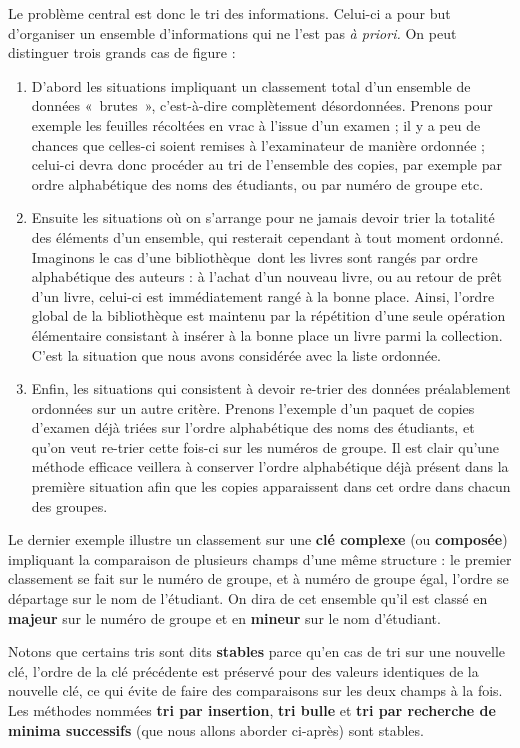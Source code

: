 {
Le problème central est donc le tri des informations. Celui-ci a pour
but d’organiser un ensemble d’informations qui ne l’est pas \textit{à
priori. }On peut distinguer trois grands cas de figure :}

\liststyleWWviiiNumi
\begin{enumerate}
\item {
D’abord les situations impliquant un classement total d’un ensemble de
données «~brutes~», c’est-à-dire complètement désordonnées. Prenons
pour exemple les feuilles récoltées en vrac à l’issue d’un examen ; il
y a peu de chances que celles-ci soient remises à l’examinateur de
manière ordonnée ; celui-ci devra donc procéder au tri de l’ensemble
des copies, par exemple par ordre alphabétique des noms des étudiants,
ou par numéro de groupe etc.}
\item {
Ensuite les situations où on s’arrange pour ne jamais devoir trier la
totalité des éléments d’un ensemble, qui resterait cependant à tout
moment ordonné. Imaginons le cas d’une bibliothèque~dont les livres
sont rangés par ordre alphabétique des auteurs : à l’achat d’un nouveau
livre, ou au retour de prêt d’un livre, celui-ci est immédiatement
rangé à la bonne place. Ainsi, l’ordre global de la bibliothèque est
maintenu par la répétition d’une seule opération élémentaire consistant
à insérer à la bonne place un livre parmi la collection. C’est la
situation que nous avons considérée avec la liste ordonnée.}
\item {
Enfin, les situations qui consistent à devoir re-trier des données
préalablement ordonnées sur un autre critère. Prenons l’exemple d’un
paquet de copies d’examen déjà triées sur l’ordre alphabétique des noms
des étudiants, et qu’on veut re-trier cette fois-ci sur les numéros de
groupe. Il est clair qu’une méthode efficace veillera à conserver
l’ordre alphabétique déjà présent dans la première situation afin que
les copies apparaissent dans cet ordre dans chacun des groupes.}
\end{enumerate}
{
Le dernier exemple illustre un classement sur une \textbf{clé complexe}
(ou \textbf{composée}) impliquant la comparaison de plusieurs champs
d’une même structure : le premier classement se fait sur le numéro de
groupe, et à numéro de groupe égal, l’ordre se départage sur le nom de
l’étudiant. On dira de cet ensemble qu’il est classé en \textbf{majeur}
sur le numéro de groupe et en \textbf{mineur} sur le nom d’étudiant.}

{
Notons que certains tris sont dits \textbf{stables} parce
qu'en cas de tri sur une nouvelle clé, l’ordre de la
clé précédente est préservé pour des valeurs identiques de la nouvelle
clé, ce qui évite de faire des comparaisons sur les deux champs à la
fois. Les méthodes nommées \textbf{tri par insertion}, \textbf{tri
bulle} et \textbf{tri par recherche de minima successifs }(que nous
allons aborder ci-après) sont stables.}

